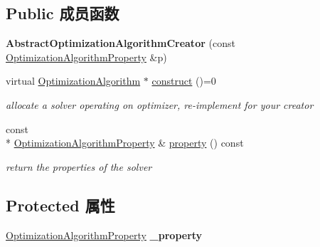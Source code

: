\subsection*{Public 成员函数}
\begin{DoxyCompactItemize}
\item 
\hypertarget{classg2o_1_1AbstractOptimizationAlgorithmCreator_ae9f64a630d2e641043aabc98660495d8}{{\bfseries Abstract\-Optimization\-Algorithm\-Creator} (const \hyperlink{structg2o_1_1OptimizationAlgorithmProperty}{Optimization\-Algorithm\-Property} \&p)}\label{classg2o_1_1AbstractOptimizationAlgorithmCreator_ae9f64a630d2e641043aabc98660495d8}

\item 
\hypertarget{classg2o_1_1AbstractOptimizationAlgorithmCreator_a96a737bda0f932ac7dd51aa468795353}{virtual \hyperlink{classg2o_1_1OptimizationAlgorithm}{Optimization\-Algorithm} $\ast$ \hyperlink{classg2o_1_1AbstractOptimizationAlgorithmCreator_a96a737bda0f932ac7dd51aa468795353}{construct} ()=0}\label{classg2o_1_1AbstractOptimizationAlgorithmCreator_a96a737bda0f932ac7dd51aa468795353}

\begin{DoxyCompactList}\small\item\em allocate a solver operating on optimizer, re-\/implement for your creator \end{DoxyCompactList}\item 
\hypertarget{classg2o_1_1AbstractOptimizationAlgorithmCreator_af070d079a64f6d23afe6df25e154b160}{const \\*
\hyperlink{structg2o_1_1OptimizationAlgorithmProperty}{Optimization\-Algorithm\-Property} \& \hyperlink{classg2o_1_1AbstractOptimizationAlgorithmCreator_af070d079a64f6d23afe6df25e154b160}{property} () const }\label{classg2o_1_1AbstractOptimizationAlgorithmCreator_af070d079a64f6d23afe6df25e154b160}

\begin{DoxyCompactList}\small\item\em return the properties of the solver \end{DoxyCompactList}\end{DoxyCompactItemize}
\subsection*{Protected 属性}
\begin{DoxyCompactItemize}
\item 
\hypertarget{classg2o_1_1AbstractOptimizationAlgorithmCreator_acf2663d0d6dec71049e4853a9825eafb}{\hyperlink{structg2o_1_1OptimizationAlgorithmProperty}{Optimization\-Algorithm\-Property} {\bfseries \-\_\-property}}\label{classg2o_1_1AbstractOptimizationAlgorithmCreator_acf2663d0d6dec71049e4853a9825eafb}

\end{DoxyCompactItemize}


